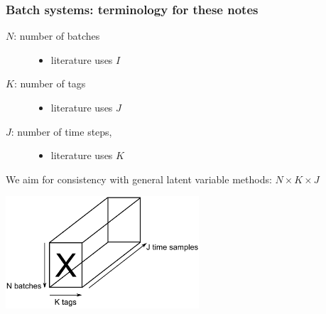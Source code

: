 \documentclass[handout, 12pt]{beamer}
\begin{document}
\begin{frame}\frametitle{Batch systems: terminology for these notes}

\begin{description} 
	
	\item[ \( N \): number of batches] 
	
		\begin{itemize}
			\item	literature uses \( I \)
		\end{itemize}
		
	\item[\( K \): number of tags] 
	
		\begin{itemize}
			\item	 literature uses \( J \)
		\end{itemize}
	
	\item[\( J \): number of time steps, ] 
	
		\begin{itemize}
			\item	 literature uses \( K \)
		\end{itemize}
\end{description}

We aim for consistency with general latent variable methods: \( N \times K \times J \)

\begin{center}
	\includegraphics[width=7.2cm]{images/batch-data-cube.png}
\end{center}

\end{frame}
\end{document}
